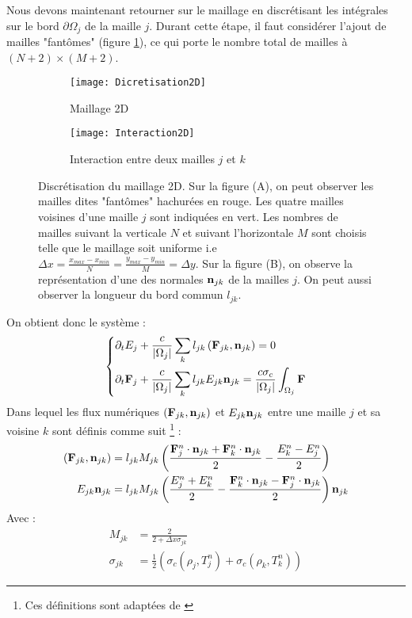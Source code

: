 Nous devons maintenant retourner sur le maillage en discrétisant les intégrales sur le bord $\partial \Omega_j$ de la maille $j$. Durant cette étape, il faut considérer l'ajout de mailles "fantômes" (figure \ref{fig:Discretisation2D}), ce qui porte le nombre total de mailles à $(N+2) \times (M+2)$. 
\begin{figure}[!h]
\begin{subfigure}{.6\textwidth}
  \centering
  \texttt{[image: Dicretisation2D]}  
  \caption{Maillage 2D}
  \label{fig:Discretisation2D}
\end{subfigure}
\begin{subfigure}{.4\textwidth}
  \centering
  \texttt{[image: Interaction2D]}  
  \caption{Interaction entre deux mailles $j$ et $k$}
  \label{fig:Interaction2D}
\end{subfigure}

\centering
\decoRule
\caption{Discrétisation du maillage 2D. Sur la figure (A), on peut observer les mailles dites "fantômes" hachurées en rouge. Les quatre mailles voisines d'une maille $j$ sont indiquées en vert. Les nombres de mailles suivant la verticale $N$ et suivant l'horizontale $M$ sont choisis telle que le maillage soit uniforme i.e $\Delta x = \frac{x_{max}-x_{min}}{N} = \frac{y_{max}-y_{min}}{M} = \Delta y$. Sur la figure (B), on observe la représentation d'une des normales $\mathbf{n}_{jk}$ de la mailles $j$. On peut aussi observer la longueur du bord commun $l_{jk}.$}
\label{fig:2DMesh}
\end{figure}

\noindent On obtient donc le système :
\begin{equation*} 
    \begin{dcases}
    \partial_t E_j + \frac{c}{\left|\Omega_j\right|} \sum_k l_{jk}\left( \mathbf{F}_{jk}, \mathbf{n}_{jk} \right) = 0\\
    \partial_t \mathbf{F}_j + \frac{c}{\left|\Omega_j\right|} \sum_k l_{jk} E_{jk} \mathbf{n}_{jk} = \frac{c \sigma_c}{\left|\Omega_j\right|} \int_{\Omega_j} \mathbf{F}
    \end{dcases}   
\label{eqn:VolFin}
\end{equation*}
Dans lequel les flux numériques $\left( \mathbf{F}_{jk}, \mathbf{n}_{jk} \right)$ et $E_{jk} \mathbf{n}_{jk}$ entre une maille $j$ et sa voisine $k$ sont définis comme suit \footnote{Ces définitions sont adaptées de \parencite[161]{Reference2}} :
\begin{align*}
 \left(\mathbf{F}_{jk}, \mathbf{n}_{jk} \right) &= l_{jk} M_{jk} \left( \frac{\mathbf{F}_j^n \cdot \mathbf{n}_{jk} + \mathbf{F}_k^n \cdot \mathbf{n}_{jk}}{2} - \frac{E_k^n - E_j^n}{2} \right) \\
 E_{jk} \mathbf{n}_{jk} &= l_{jk} M_{jk} \left( \frac{E_j^n + E_k^n}{2} - \frac{\mathbf{F}_k^n \cdot \mathbf{n}_{jk} - \mathbf{F}_j^n \cdot \mathbf{n}_{jk}}{2} \right) \mathbf{n}_{jk} \\
\end{align*}
Avec :
\begin{align*}
 M_{jk} &= \frac{2}{2 + \Delta x \sigma_{jk}}  \\
 \sigma_{jk} &= \frac{1}{2} \left( \sigma_c(\rho_j,T_j^n) + \sigma_c(\rho_k,T_k^n) \right)
\end{align*}

